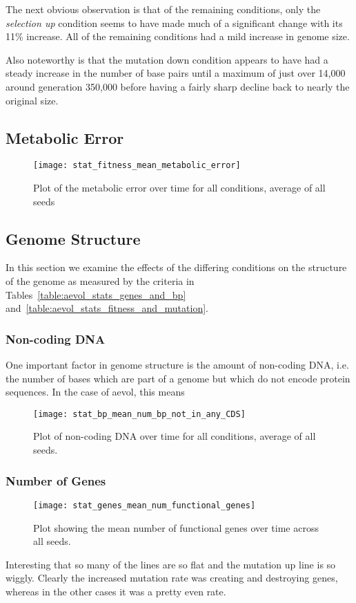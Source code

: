The next obvious observation is that of the remaining conditions, only the \textit{selection up} condition seems to have made much of a significant change with its 11\% increase. All of the remaining conditions had a mild increase in genome size. 

Also noteworthy is that the mutation down condition appears to have had a steady increase in the number of base pairs until a maximum of just over 14,000 around generation 350,000 before having a fairly sharp decline back to nearly the original size. 

\subsection{Metabolic Error}
\begin{figure}[H]
	\texttt{[image: stat\_fitness\_mean\_metabolic\_error]}
	\caption[Metabolic error]{Plot of the metabolic error over time for all conditions, average of all seeds}
	\label{fig:mean_metabolic_error}
\end{figure}
\subsection{Genome Structure}
In this section we examine the effects of the differing conditions on the structure of the genome as measured by the criteria in Tables~\ref{table:aevol_stats_genes_and_bp} and~\ref{table:aevol_stats_fitness_and_mutation}. 
\subsubsection{Non-coding DNA}
One important factor in genome structure is the amount of non-coding DNA, i.e. the number of bases which are part of a genome but which do not encode protein sequences. In the case of aevol, this means 
\begin{figure}[H]
	\centering
	\texttt{[image: stat\_bp\_mean\_num\_bp\_not\_in\_any\_CDS]}
	\caption[Non-coding DNA]{Plot of non-coding DNA over time for all conditions, average of all seeds.}
	\label{fig:mean_non-coding_DNA}
\end{figure}

\subsubsection{Number of Genes}
\begin{figure}[H]
	\centering
	\texttt{[image: stat\_genes\_mean\_num\_functional\_genes]}
	\caption[Mean number of functional genes]{Plot showing the mean number of functional genes over time across all seeds.}
	\label{fig:mean_num_functional_genes}
\end{figure}
Interesting that so many of the lines are so flat and the mutation up line is so wiggly. Clearly the increased mutation rate was creating and destroying genes, whereas in the other cases it was a pretty even rate. 
